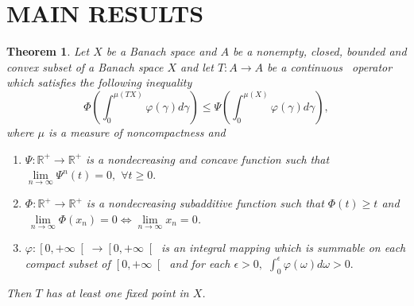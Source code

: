 \documentclass{amsart}
\newtheorem{theorem}{Theorem}
\theoremstyle{plain}
\numberwithin{equation}{section}
\begin{document}
\section{\protect\bigskip MAIN RESULTS}

\begin{theorem}
\label{mainth}Let $X$ be a Banach space and $A$ be a nonempty, closed,
bounded and convex subset of a Banach space $X$ and let $T:A\rightarrow A$
be a continuous \ operator which satisfies the following inequality\begin{equation}
\Phi \left( \int_{0}^{\mu \left( TX\right) }\varphi \left( \gamma \right)
d\gamma \right) \leqslant \Psi \left( \int_{0}^{\mu \left( X\right) }\varphi
\left( \gamma \right) d\gamma \right) ,  \label{ineq}
\end{equation}where $\mu $ is a measure of noncompactness and

\begin{enumerate}
\item[$\left( i\right) $] $\Psi :\mathbb{R}^{+}\rightarrow \mathbb{R}^{+}$
is a nondecreasing and concave function such that $\lim\limits_{n\rightarrow
\infty }\Psi ^{n}\left( t\right) =0,$ $\forall t\geqslant 0.$

\item[$\left( ii\right) $] $\Phi :\mathbb{R}^{+}\rightarrow \mathbb{R}^{+}$
is a nondecreasing subadditive function such that $\Phi \left( t\right)
\geqslant t$ and$\ \lim\limits_{n\rightarrow \infty }\Phi \left(
x_{n}\right) =0\Leftrightarrow \lim\limits_{n\rightarrow \infty }x_{n}=0$.

\item[$\left( iii\right) $] $\varphi :\left[ 0,+\infty \right[ \rightarrow \left[ 0,+\infty \right[ $ is an integral mapping which is summable on each
compact subset of $\left[ 0,+\infty \right[ $ and for each $\epsilon >0,$ $\int_{0}^{\epsilon }\varphi \left( \omega \right) d\omega >0.$
\end{enumerate}

Then $T$ has at least one fixed point in $X$.
\end{theorem}
\end{document}
